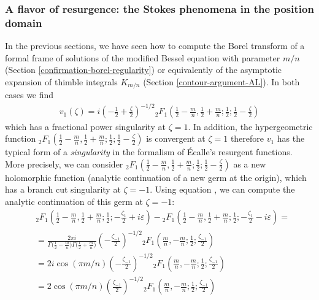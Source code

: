 \documentclass{article}
\theoremstyle{definition}
\theoremstyle{plain}
\begin{document}
{\subsubsection{A flavor of resurgence: the Stokes phenomena in the position domain}\label{resurgence-AL}

In the previous sections, we have seen how to compute the Borel transform of a formal frame of solutions of the modified Bessel equation with parameter $m/n$ (Section \ref{confirmation-borel-regularity}) or equivalently of the asymptotic expansion of thimble integrals $K_{m/n}$ (Section \ref{contour-argument-AL}). In both cases we find 
\begin{align*}
    v_1(\zeta)= i \left(-\frac{1}{2}+\frac{\zeta}{2}\right)^{-1/2} {}_2F_1\left(\frac{1}{2}-\frac{m}{n},\frac{1}{2}+\frac{m}{n};\frac{1}{2};\frac{1}{2}-\frac{\zeta}{2}\right)
\end{align*}
which has a fractional power singularity at $\zeta=1$. In addition, the hypergeometric function ${}_2F_1\left(\frac{1}{2}-\frac{m}{n},\frac{1}{2}+\frac{m}{n};\frac{1}{2};\frac{1}{2}-\frac{\zeta}{2}\right)$ is convergent at $\zeta=1$ therefore $v_1$ has the typical form of a \textit{singularity} in the formalism of \'Ecalle's resurgent functions. More precisely, we can consider ${}_2F_1\left(\frac{1}{2}-\frac{m}{n},\frac{1}{2}+\frac{m}{n};\frac{1}{2};\frac{1}{2}-\frac{\zeta}{2}\right)$ as a new holomorphic function (analytic continuation of a new germ at the origin), which has a branch cut singularity at $\zeta=-1$. Using equation \cite[15.2.3]{dlmf}, we can compute the analytic continuation of this germ at $\zeta=-1$: 
\begin{align*}
&{}_2F_1\left(\frac{1}{2}-\frac{m}{n},\frac{1}{2}+\frac{m}{n};\frac{1}{2};-\frac{\zeta_1}{2}+i\varepsilon\right)-{}_2F_1\left(\frac{1}{2}-\frac{m}{n},\frac{1}{2}+\frac{m}{n};\frac{1}{2};-\frac{\zeta_1}{2}-i\varepsilon\right)=\\
&=\frac{2\pi i}{\Gamma\big(\tfrac{1}{2}-\tfrac{m}{n}\big)\Gamma\big(\tfrac{1}{2}+\tfrac{m}{n}\big)} \left(-\frac{\zeta_{-1}}{2}\right)^{-1/2} {}_2F_1\left(\frac{m}{n},-\frac{m}{n};\frac{1}{2};\frac{\zeta_{-1}}{2}\right) \\
&=2 i\cos(\pi m/n) \left(-\frac{\zeta_{-1}}{2}\right)^{-1/2} {}_2F_1\left(\frac{m}{n},-\frac{m}{n};\frac{1}{2};\frac{\zeta_{-1}}{2}\right) \\
&=2\cos(\pi m/n) \left(\frac{\zeta_{-1}}{2}\right)^{-1/2} {}_2F_1\left(\frac{m}{n},-\frac{m}{n};\frac{1}{2};\frac{\zeta_{-1}}{2}\right) \\

\end{align*}}
\end{document}
